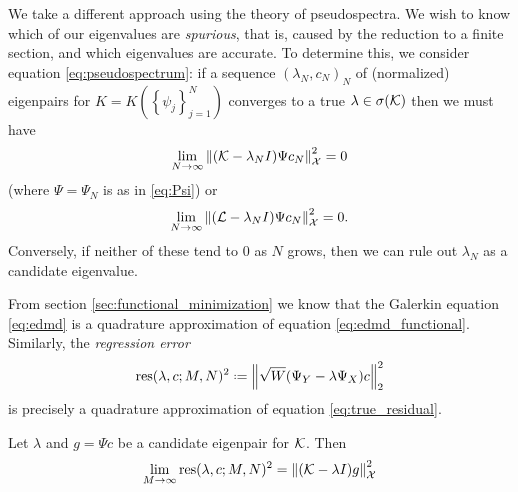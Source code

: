 We take a different approach using the theory of pseudospectra. We wish to know which of 
our eigenvalues are \emph{spurious}, that is, caused by the reduction to a finite section, 
and which eigenvalues are accurate. To determine this, we consider equation 
\ref{eq:pseudospectrum}: if a sequence $(\lambda_N, c_N)_N$ of (normalized) eigenpairs for 
$K = K(\left\{ \psi_j \right\}_{j=1}^N)$ converges to a true $\lambda \in \sigma (\mathcal{K})$ 
then we must have 
\begin{equation}
    \label{eq:true_residual}
    \lim_{N \to \infty} \left\| (\mathcal{K} - \lambda_N I) \Psi c_N \right\|_{\mathcal{X}}^2 = 0
\end{equation}
(where $\Psi = \Psi_N$ is as in \ref{eq:Psi}) or 
\begin{equation}
    \lim_{N \to \infty} \left\| (\mathcal{L} - \lambda_N I) \Psi c_N \right\|_{\mathcal{X}}^2 = 0 . 
\end{equation}
Conversely, if neither of these tend to $0$ as $N$ grows, then we can rule out 
$\lambda_N$ as a candidate eigenvalue. 

From section \ref{sec:functional_minimization} we know that the Galerkin equation 
\ref{eq:edmd} is a quadrature approximation of equation \ref{eq:edmd_functional}. 
Similarly, the \emph{regression error}
\begin{equation}
    \label{eq:res}
    \res (\lambda, c; M, N)^2 \defeq \left\| \sqrt{W} (\YY - \lambda \YX) c \right\|_2^2
\end{equation}
is precisely a quadrature approximation of equation \ref{eq:true_residual}. 

\begin{theorem}
    \label{thm:res_M_limit}
    Let $\lambda$ and $g = \Psi c$ be a candidate eigenpair for $\mathcal{K}$. Then 
    \begin{equation}
        \lim_{M \to \infty} \text{res} (\lambda, c; M, N)^2
        = \left\| (\mathcal{K} - \lambda I) g \right\|_{\mathcal{X}}^2
    \end{equation}
\end{theorem}

